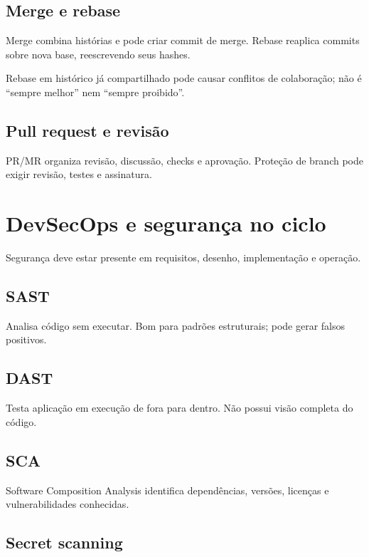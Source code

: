\subsection{Merge e rebase}

Merge combina histórias e pode criar commit de merge. Rebase reaplica commits sobre nova base, reescrevendo seus hashes.

Rebase em histórico já compartilhado pode causar conflitos de colaboração; não é ``sempre melhor'' nem ``sempre proibido''.

\subsection{Pull request e revisão}

PR/MR organiza revisão, discussão, checks e aprovação. Proteção de branch pode exigir revisão, testes e assinatura.

\section{DevSecOps e segurança no ciclo}

Segurança deve estar presente em requisitos, desenho, implementação e operação.

\subsection{SAST}

Analisa código sem executar. Bom para padrões estruturais; pode gerar falsos positivos.

\subsection{DAST}

Testa aplicação em execução de fora para dentro. Não possui visão completa do código.

\subsection{SCA}

Software Composition Analysis identifica dependências, versões, licenças e vulnerabilidades conhecidas.

\subsection{Secret scanning}

